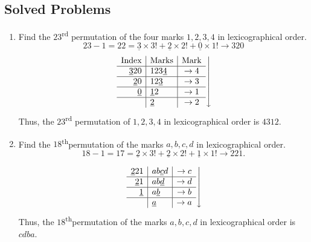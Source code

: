 \documentclass[svgnames]{article}
\renewcommand{\th}{\textsuperscript{th}}
\begin{document}
\subsection*{Solved Problems}
\begin{enumerate}
\item Find the $23$\textsuperscript{rd} permutation of the four marks $1, 2, 3, 4$ in lexicographical order.
\begin{equation*}
23 - 1 = 22 = \underline{3} \times 3!  + \underline{2} \times 2! + \underline{0} \times 1! \to 320
\end{equation*}
\begin{equation*}
\left.
\begin{array}{r|l|c}
\text{Index} & \text{Marks} & \text{Mark}\\
\hline
\underline{3}20 & 123\underline{4} & \to 4\\
\hline
\underline{2}0 & 12\underline{3} & \to 3\\
\hline
\underline{0} & \underline{1}2 & \to 1\\
\hline
& \underline{2} & \to 2
\end{array}
\right\downarrow
\end{equation*}
Thus, the $23$\textsuperscript{rd} permutation of $1, 2, 3, 4$ in lexicographical order is $\boxed{4312}$.

\item Find the $18$\th permutation of the marks $a, b, c, d$ in lexicographical order.
\begin{equation*}
18 - 1 = 17 = \underline{2} \times 3! + \underline{2} \times 2! + \underline{1} \times 1! \to 221.
\end{equation*}

\begin{equation*}
\left.
\begin{array}{r|l|c}
\underline{2}21	&	ab\underline{c}d	&	\to c\\
\hline
\underline{2}1	&	ab\underline{d}		&	\to d\\
\hline
\underline{1}	&	a\underline{b}		&	\to b\\
\hline
				&	\underline{a}		&	\to a
\end{array}
\right\downarrow
\end{equation*}
Thus, the $18$\th permutation of the marks $a, b, c, d$ in lexicographical order is $\boxed{cdba}$.


\end{enumerate}
\end{document}
